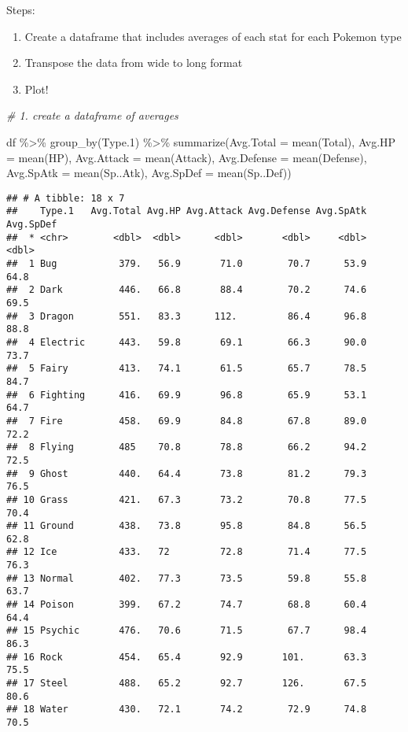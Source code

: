 \documentclass[
]{article}
\newenvironment{Shaded}{\begin{snugshade}}{\end{snugshade}}
\newcommand{\AttributeTok}[1]{\textcolor[rgb]{0.77,0.63,0.00}{#1}}
\newcommand{\CommentTok}[1]{\textcolor[rgb]{0.56,0.35,0.01}{\textit{#1}}}
\newcommand{\FloatTok}[1]{\textcolor[rgb]{0.00,0.00,0.81}{#1}}
\newcommand{\FunctionTok}[1]{\textcolor[rgb]{0.00,0.00,0.00}{#1}}
\newcommand{\NormalTok}[1]{#1}
\newcommand{\SpecialCharTok}[1]{\textcolor[rgb]{0.00,0.00,0.00}{#1}}
\providecommand{\tightlist}{%
  \setlength{\itemsep}{0pt}\setlength{\parskip}{0pt}}
\begin{document}
Steps:

\begin{enumerate}
\def\labelenumi{\arabic{enumi}.}
\tightlist
\item
  Create a dataframe that includes averages of each stat for each
  Pokemon type
\item
  Transpose the data from wide to long format
\item
  Plot!
\end{enumerate}

\begin{Shaded}
\begin{Highlighting}[]
\CommentTok{\# 1. create a dataframe of averages}

\NormalTok{df }\SpecialCharTok{\%\textgreater{}\%} 
  \FunctionTok{group\_by}\NormalTok{(Type}\FloatTok{.1}\NormalTok{) }\SpecialCharTok{\%\textgreater{}\%}
  \FunctionTok{summarize}\NormalTok{(}\AttributeTok{Avg.Total =} \FunctionTok{mean}\NormalTok{(Total),}
            \AttributeTok{Avg.HP =} \FunctionTok{mean}\NormalTok{(HP),}
            \AttributeTok{Avg.Attack =} \FunctionTok{mean}\NormalTok{(Attack),}
            \AttributeTok{Avg.Defense =} \FunctionTok{mean}\NormalTok{(Defense),}
            \AttributeTok{Avg.SpAtk =} \FunctionTok{mean}\NormalTok{(Sp..Atk),}
            \AttributeTok{Avg.SpDef =} \FunctionTok{mean}\NormalTok{(Sp..Def)) }
\end{Highlighting}
\end{Shaded}

\begin{verbatim}
## # A tibble: 18 x 7
##    Type.1   Avg.Total Avg.HP Avg.Attack Avg.Defense Avg.SpAtk Avg.SpDef
##  * <chr>        <dbl>  <dbl>      <dbl>       <dbl>     <dbl>     <dbl>
##  1 Bug           379.   56.9       71.0        70.7      53.9      64.8
##  2 Dark          446.   66.8       88.4        70.2      74.6      69.5
##  3 Dragon        551.   83.3      112.         86.4      96.8      88.8
##  4 Electric      443.   59.8       69.1        66.3      90.0      73.7
##  5 Fairy         413.   74.1       61.5        65.7      78.5      84.7
##  6 Fighting      416.   69.9       96.8        65.9      53.1      64.7
##  7 Fire          458.   69.9       84.8        67.8      89.0      72.2
##  8 Flying        485    70.8       78.8        66.2      94.2      72.5
##  9 Ghost         440.   64.4       73.8        81.2      79.3      76.5
## 10 Grass         421.   67.3       73.2        70.8      77.5      70.4
## 11 Ground        438.   73.8       95.8        84.8      56.5      62.8
## 12 Ice           433.   72         72.8        71.4      77.5      76.3
## 13 Normal        402.   77.3       73.5        59.8      55.8      63.7
## 14 Poison        399.   67.2       74.7        68.8      60.4      64.4
## 15 Psychic       476.   70.6       71.5        67.7      98.4      86.3
## 16 Rock          454.   65.4       92.9       101.       63.3      75.5
## 17 Steel         488.   65.2       92.7       126.       67.5      80.6
## 18 Water         430.   72.1       74.2        72.9      74.8      70.5
\end{verbatim}
\end{document}
